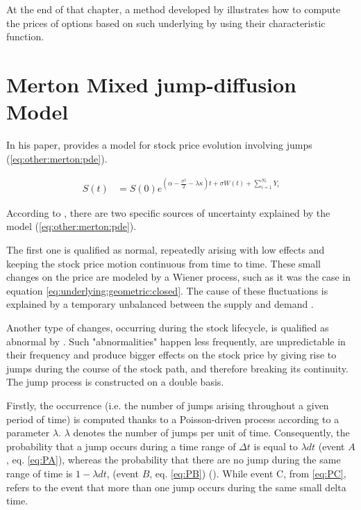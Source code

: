\documentclass[12pt,a4paper]{report}
\newcommand{\Bm}{W\left(t\right)}
\newcommand{\St}{S\left(t\right)}
\begin{document}
At the end of that chapter, a method developed by \citet{heston1993} illustrates how to compute the prices of options based on such underlying by using their characteristic function.




\section{Merton Mixed jump-diffusion Model}
\label{sec:other:merton}

In his paper, \citet{merton76} provides a model for stock price evolution involving jumps (\cref{eq:other:merton:pde}). 


\begin{align}
  \St &= S\left(0\right) e^{\left(\alpha - \frac{\sigma^2}{2} - \lambda \kappa\right) t + \sigma \Bm + \sum_{i=1}^{N_t} Y_i}
  \label{eq:other:merton:pde}
\end{align}
  
According to \citet{merton76}, there are two specific sources of uncertainty explained by the model (\cref{eq:other:merton:pde}). 

The first one is qualified as normal, repeatedly arising with low effects and keeping the stock price motion continuous from time to time. These small changes on the price are modeled by a Wiener process, such as it was the case in equation \ref{eq:underlying:geometric:closed}. The cause of these fluctuations is explained by a temporary unbalanced between the supply and demand \citet{merton76}.

Another type of changes, occurring during the stock lifecycle, is qualified as abnormal by \citet{merton76}. 
Such "abnormalities" happen less frequently, are unpredictable in their frequency and produce bigger effects on the stock price by giving rise to jumps during the course of the stock path, and therefore breaking its continuity. The jump process is constructed on a double basis. 

Firstly, the occurrence (i.e. the number of jumps arising throughout a given period of time) is computed thanks to a Poisson-driven process according to a parameter $\lambda$. 
$\lambda$ denotes the number of jumps per unit of time. Consequently, the probability that a jump occurs during a time range of $\Delta t$ is equal to $\lambda dt$ (event $A$, eq. \ref{eq:PA}), whereas the probability that there are no jump during the same range of time is $1 - \lambda dt$, (event $B$, eq. \ref{eq:PB}) (\citet{matsuda2004}). While event C, from \cref{eq:PC}, refers to the event that more than one jump occurs during the same small delta time.
\end{document}
